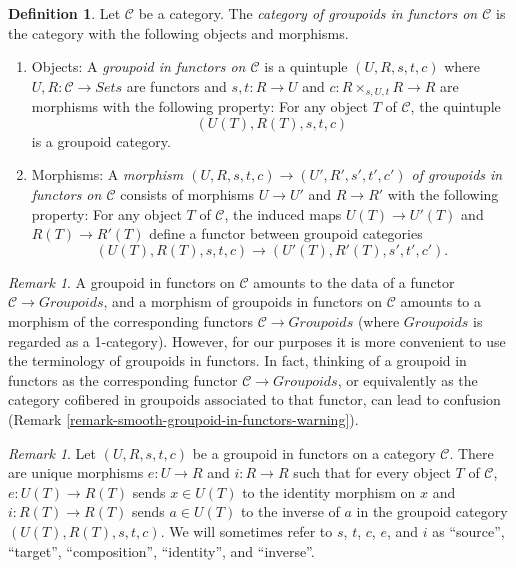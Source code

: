 \documentclass{stacks-project}
\theoremstyle{plain}
\theoremstyle{definition}
\newtheorem{definition}[subsection]{Definition}
\theoremstyle{remark}
\newtheorem{remark}[subsection]{Remark}
\numberwithin{equation}{subsection}
\begin{document}
\begin{definition}
\label{definition-groupoid-in-functors}
Let $\mathcal{C}$ be a category. The
{\it category of groupoids in functors on $\mathcal{C}$}
is the category with the following objects and morphisms.
\begin{enumerate}
\item Objects: A {\it groupoid in functors on $\mathcal{C}$} is a quintuple
$(U, R, s, t, c)$ where $U, R : \mathcal{C} \to \textit{Sets}$ are
functors and $s, t : R \to U$ and $c : R \times_{s, U, t} R \to R$
are morphisms with the following property: For any object $T$ of $\mathcal{C}$,
the quintuple
$$
(U(T), R(T), s, t, c)
$$
is a groupoid category.
\item Morphisms: A {\it morphism $(U, R, s, t, c) \to (U', R', s', t', c')$ of
groupoids in functors on $\mathcal{C}$} consists of morphisms $U \to U'$
and $R \to R'$ with the following property: For any object $T$ of
$\mathcal{C}$, the induced maps $U(T) \to U'(T)$ and
$R(T) \to R'(T)$ define a functor between groupoid categories
$$
(U(T), R(T), s, t, c) \to (U'(T), R'(T), s', t', c').
$$
\end{enumerate}
\end{definition}

\begin{remark}
\label{remark-confusion-groupoids-in-functors}
A groupoid in functors on $\mathcal{C}$ amounts to the data of a functor
$\mathcal{C} \to \textit{Groupoids}$, and a morphism of groupoids
in functors on $\mathcal{C}$ amounts to a morphism of the corresponding
functors
$\mathcal{C} \to \textit{Groupoids}$ (where
$\textit{Groupoids}$ is regarded as a 1-category).  However, for our
purposes it is more convenient to use the terminology of groupoids in functors.
In fact, thinking of a groupoid in functors as the corresponding functor
$\mathcal{C} \to \textit{Groupoids}$, or equivalently as the
category cofibered in groupoids associated to that functor, can lead to
confusion (Remark \ref{remark-smooth-groupoid-in-functors-warning}).
\end{remark}

\begin{remark}
\label{remark-identity-inverse}
Let $(U, R, s, t, c)$ be a groupoid in functors on a category $\mathcal{C}$.
There are unique morphisms $e : U \to R$ and $i : R \to R$ such that
for every object $T$ of $\mathcal{C}$, $e: U(T) \to R(T)$ sends
$x \in U(T)$ to the identity morphism on $x$ and $i: R(T) \to R(T)$ sends
$a \in U(T)$ to the inverse of $a$ in the groupoid category
$(U(T), R(T), s, t, c)$. We will sometimes refer to $s$, $t$, $c$, $e$,
and $i$ as ``source'', ``target'', ``composition'', ``identity'', and
``inverse''.
\end{remark}
\end{document}
